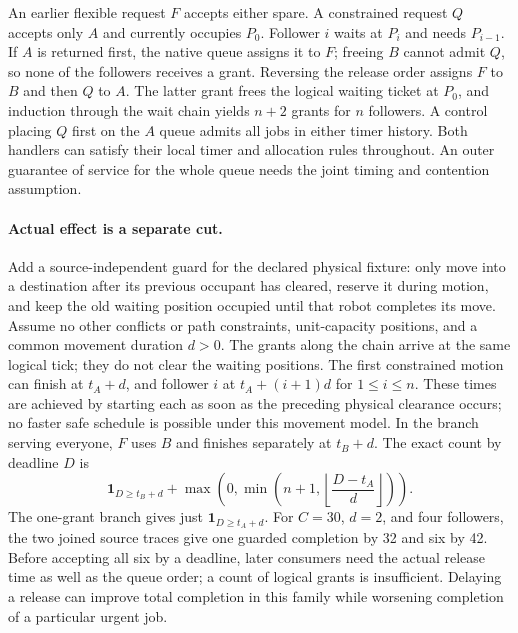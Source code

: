 \documentclass{article}
\begin{document}
An earlier flexible request \(F\) accepts either spare. A constrained request \(Q\) accepts only \(A\) and currently occupies \(P_0\). Follower \(i\) waits at \(P_i\) and needs \(P_{i-1}\). If \(A\) is returned first, the native queue assigns it to \(F\); freeing \(B\) cannot admit \(Q\), so none of the followers receives a grant. Reversing the release order assigns \(F\) to \(B\) and then \(Q\) to \(A\). The latter grant frees the logical waiting ticket at \(P_0\), and induction through the wait chain yields \(n+2\) grants for \(n\) followers. A control placing \(Q\) first on the \(A\) queue admits all jobs in either timer history. Both handlers can satisfy their local timer and allocation rules throughout. An outer guarantee of service for the whole queue needs the joint timing and contention assumption.

\paragraph{Actual effect is a separate cut.}
Add a source-independent guard for the declared physical fixture: only move into a destination after its previous occupant has cleared, reserve it during motion, and keep the old waiting position occupied until that robot completes its move. Assume no other conflicts or path constraints, unit-capacity positions, and a common movement duration \(d>0\). The grants along the chain arrive at the same logical tick; they do not clear the waiting positions. The first constrained motion can finish at \(t_A+d\), and follower \(i\) at \(t_A+(i+1)d\) for \(1\le i\le n\). These times are achieved by starting each as soon as the preceding physical clearance occurs; no faster safe schedule is possible under this movement model. In the branch serving everyone, \(F\) uses \(B\) and finishes separately at \(t_B+d\). The exact count by deadline \(D\) is
\[
  \mathbf 1_{D\ge t_B+d}+
  \max\!\left(0,\min\!\left(n+1,\left\lfloor \frac{D-t_A}{d}\right\rfloor\right)\right).
\]
The one-grant branch gives just \(\mathbf 1_{D\ge t_A+d}\). For \(C=30\), \(d=2\), and four followers, the two joined source traces give one guarded completion by 32 and six by 42. Before accepting all six by a deadline, later consumers need the actual release time as well as the queue order; a count of logical grants is insufficient. Delaying a release can improve total completion in this family while worsening completion of a particular urgent job.
\end{document}
